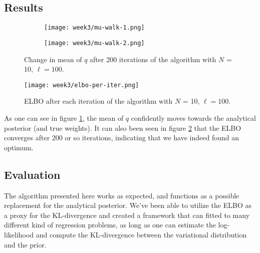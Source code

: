 \subsection{Results}
\begin{figure}[H]
  \centering
  \begin{subfigure}{0.4\textwidth}
    \texttt{[image: week3/mu-walk-1.png]}
  \end{subfigure}
  \begin{subfigure}{0.4\textwidth}
    \texttt{[image: week3/mu-walk-2.png]}
  \end{subfigure}
  \label{fig:mu-walk}
  \caption{Change in mean of $q$ after 200 iterations of the algorithm with $N$ = 10, $\ell = 100$.}
\end{figure}
\begin{figure}[H]
  \centering
  \texttt{[image: week3/elbo-per-iter.png]}
  \label{fig:elbo}
  \caption{ELBO after each iteration of the algorithm with $N$ = 10, $\ell = 100$.}
\end{figure}
As one can see in figure \ref{fig:mu-walk}, the mean of $q$ confidently moves towards the analytical posterior (and true weights).
It can also been seen in figure \ref{fig:elbo} that the ELBO converges after 200 or so iterations, indicating that we have indeed found an optimum.
\subsection{Evaluation}
The algorithm presented here works as expected, and functions as a possible replacement for the analytical posterior.
We've been able to utilize the ELBO as a proxy for the KL-divergence and created a framework that can fitted to many different kind of regression problems, 
as long as one can estimate the log-likelihood and compute the KL-divergence between the variational distribution and the prior.

